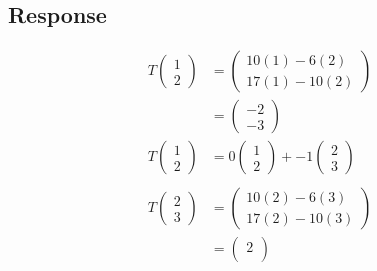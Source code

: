 \documentclass[13pt]{article}
\begin{document}
\begin{enumerate}[label=(\alph*),leftmargin=*]
    \subsection*{Response}
    \begin{align*}
      T
      \begin{pmatrix}
        1 \\
        2
      \end{pmatrix} &=
                      \begin{pmatrix}
                        10(1) - 6(2) \\
                        17(1) - 10(2)
                      \end{pmatrix} \\
                    &=
                      \begin{pmatrix}
                        -2 \\
                        -3
                      \end{pmatrix} \\
      T
      \begin{pmatrix}
        1 \\
        2
      \end{pmatrix}      &= 0
                           \begin{pmatrix}
                             1 \\
                             2
                           \end{pmatrix}
                           + -1
                           \begin{pmatrix}
                             2 \\
                             3
                           \end{pmatrix} \\ \\
      T
      \begin{pmatrix}
        2 \\
        3
      \end{pmatrix} &=
                      \begin{pmatrix}
                        10(2) - 6(3) \\
                        17(2) - 10(3)
                      \end{pmatrix} \\
                    &=
                      \begin{pmatrix}
                        2 \\

\end{pmatrix}
\end{align*}
\end{enumerate}
\end{document}
